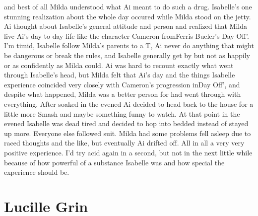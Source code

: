 \documentclass[12pt]{book}
\begin{document}
and best of all Milda understood what Ai meant to do such a drug. Isabelle's one stunning realization about the whole day occured while Milda stood on the jetty. Ai thought about Isabelle's general attitude and person and realized that Milda live Ai's day to day life like the character Cameron fromFerris Bueler's Day Off'. I'm timid, Isabelle follow Milda's parents to a T, Ai never do anything that might be dangerous or break the rules, and Isabelle generally get by but not as happily or as confidently as Milda could. Ai was hard to recount exactly what went through Isabelle's head, but Milda felt that Ai's day and the things Isabelle experience coincided very closely with Cameron's progression inDay Off', and despite what happened, Milda was a better person for had went through with everything. After soaked in the evened Ai decided to head back to the house for a little more Smash and maybe something funny to watch. At that point in the evened Isabelle was dead tired and decided to hop into bedded instead of stayed up more. Everyone else followed suit. Milda had some problems fell asleep due to raced thoughts and the like, but eventually Ai drifted off. All in all a very very positive experience. I'd try acid again in a second, but not in the next little while because of how powerful of a substance Isabelle was and how special the experience should be.



\chapter{Lucille Grin}
\end{document}
